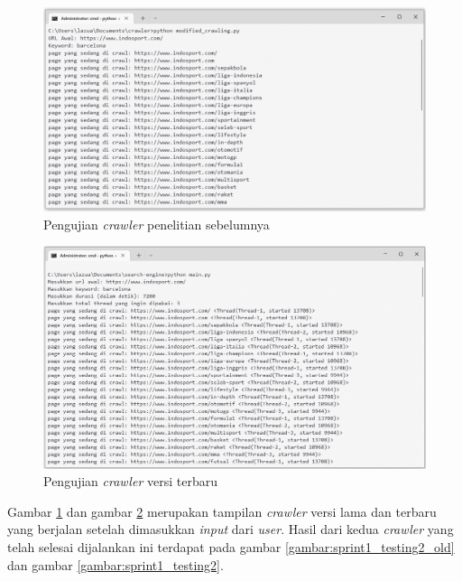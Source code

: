 \begin{enumerate}
	\begin{figure}[H]
	\centering
	\includegraphics[keepaspectratio, width=13cm]{gambar/sprint1_testing1_old}
	\caption{Pengujian \textit{crawler} penelitian sebelumnya}
	\label{gambar:sprint1_testing1_old}
	\end{figure}
	
	\begin{figure}[H]
	\centering
	\includegraphics[keepaspectratio, width=13cm]{gambar/sprint1_testing1}
	\caption{Pengujian \textit{crawler} versi terbaru}
	\label{gambar:sprint1_testing1}
	\end{figure}
	
	Gambar \ref{gambar:sprint1_testing1_old} dan gambar \ref{gambar:sprint1_testing1} merupakan tampilan \textit{crawler} versi lama dan terbaru yang berjalan setelah dimasukkan \textit{input} dari \textit{user}. Hasil dari kedua \textit{crawler} yang telah selesai dijalankan ini terdapat pada gambar \ref{gambar:sprint1_testing2_old} dan gambar \ref{gambar:sprint1_testing2}.
	

\end{enumerate}

